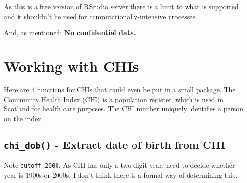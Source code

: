 \documentclass[]{book}
\newenvironment{Shaded}{\begin{snugshade}}{\end{snugshade}}
\newcommand{\CommentTok}[1]{\textcolor[rgb]{0.56,0.35,0.01}{\textit{#1}}}
\newcommand{\ControlFlowTok}[1]{\textcolor[rgb]{0.13,0.29,0.53}{\textbf{#1}}}
\newcommand{\DataTypeTok}[1]{\textcolor[rgb]{0.13,0.29,0.53}{#1}}
\newcommand{\DecValTok}[1]{\textcolor[rgb]{0.00,0.00,0.81}{#1}}
\newcommand{\KeywordTok}[1]{\textcolor[rgb]{0.13,0.29,0.53}{\textbf{#1}}}
\newcommand{\NormalTok}[1]{#1}
\newcommand{\OperatorTok}[1]{\textcolor[rgb]{0.81,0.36,0.00}{\textbf{#1}}}
\newcommand{\StringTok}[1]{\textcolor[rgb]{0.31,0.60,0.02}{#1}}
\theoremstyle{definition}
\theoremstyle{definition}
\theoremstyle{definition}
\theoremstyle{remark}
\begin{document}
As this is a free version of RStudio server there is a limit to what is
supported and it shouldn't be used for computationally-intensive
processes.

And, as mentioned: \textbf{No confidential data.}

\hypertarget{working-with-chis}{%
\section{Working with CHIs}\label{working-with-chis}}

Here are 4 functions for CHIs that could even be put in a small package.
The Community Health Index (CHI) is a population register, which is used
in Scotland for health care purposes. The CHI number uniquely identifies
a person on the index.

\hypertarget{chi_dob---extract-date-of-birth-from-chi}{%
\subsection{\texorpdfstring{\texttt{chi\_dob()} - Extract date of birth
from
CHI}{chi\_dob() - Extract date of birth from CHI}}\label{chi_dob---extract-date-of-birth-from-chi}}

Note \texttt{cutoff\_2000}. As CHI has only a two digit year, need to
decide whether year is 1900s or 2000s. I don't think there is a formal
way of determining this.

\begin{Shaded}
\end{Shaded}
\end{document}
